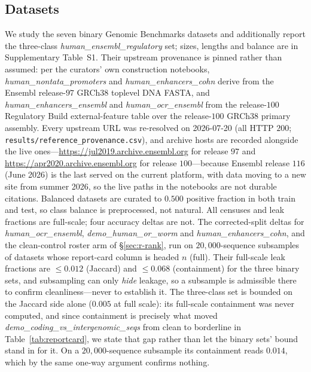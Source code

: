 \documentclass[webpdf,modern,large,namedate]{oup-authoring-template}%
\begin{document}
\subsection{Datasets}\label{sec:m-data}
We study the seven binary Genomic Benchmarks datasets \citep{gresova2023} and additionally report the three-class \textit{human\_ensembl\_regulatory} set; sizes, lengths and balance are in Supplementary Table~S1. Their upstream provenance is pinned rather than assumed: per the curators' own construction notebooks, \textit{human\_nontata\_promoters} and \textit{human\_enhancers\_cohn} derive from the Ensembl release-$97$ GRCh38 toplevel DNA FASTA, and \textit{human\_enhancers\_ensembl} and \textit{human\_ocr\_ensembl} from the release-$100$ Regulatory Build external-feature table over the release-$100$ GRCh38 primary assembly. Every upstream URL was re-resolved on 2026-07-20 (all HTTP $200$; \texttt{results/reference\_provenance.csv}), and archive hosts are recorded alongside the live ones---\url{https://jul2019.archive.ensembl.org} for release $97$ and \url{https://apr2020.archive.ensembl.org} for release $100$---because Ensembl release $116$ (June 2026) is the last served on the current platform, with data moving to a new site from summer 2026, so the live paths in the notebooks are not durable citations. Balanced datasets are curated to $0.500$ positive fraction in both train and test, so class balance is preprocessed, not natural. All censuses and leak fractions are full-scale; four accuracy deltas are not. The corrected-split deltas for \textit{human\_ocr\_ensembl}, \textit{demo\_human\_or\_worm} and \textit{human\_enhancers\_cohn}, and the clean-control roster arm of \S\ref{sec:r-rank}, run on $20{,}000$-sequence subsamples of datasets whose report-card column is headed $n$ (full). Their full-scale leak fractions are $\le0.012$ (Jaccard) and $\le0.068$ (containment) for the three binary sets, and subsampling can only \emph{hide} leakage, so a subsample is admissible there to confirm cleanliness---never to establish it. The three-class set is bounded on the Jaccard side alone ($0.005$ at full scale): its full-scale containment was never computed, and since containment is precisely what moved \textit{demo\_coding\_vs\_intergenomic\_seqs} from clean to borderline in Table~\ref{tab:reportcard}, we state that gap rather than let the binary sets' bound stand in for it. On a $20{,}000$-sequence subsample its containment reads $0.014$, which by the same one-way argument confirms nothing.
\end{document}
